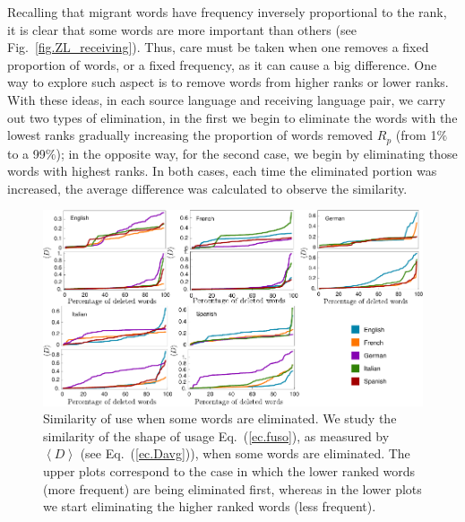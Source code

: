 \documentclass[10pt,letterpaper]{article} %
\newcommand{\eref}[1]{Eq.~(\ref{#1})}
\newcommand{\fref}[1]{Fig.~\ref{#1}}
\begin{document}



Recalling that migrant words have frequency inversely proportional to the rank,
it is clear that some words are more important than others (see
\fref{fig.ZL_receiving}).  Thus, care must be taken when one removes a fixed
proportion of words, or a fixed frequency, as it can cause a big difference. 
One way to explore such aspect is to remove words from higher ranks
or lower ranks. 
With these ideas, in each source language
and receiving language pair, we carry out two types of elimination, in the
first we begin to eliminate the words with the lowest ranks gradually 
increasing the proportion of words removed $R_{p}$ (from 1$\%$ to a
99$\%$); in the opposite way, for the second case,  we begin by
eliminating those words with highest ranks. In both cases,
each time the eliminated portion was increased, the average difference was
calculated to observe the similarity.


\begin{figure}[!h]
	\begin{adjustwidth}{-2.5cm}{1cm}
		\centering
		\includegraphics{images/dsFinal}
		\caption{{Similarity of use when some words are eliminated.}
We study the similarity of the shape of usage \eref{ec.fuso}, as measured by
$\left\langle D \right\rangle $ (see \eref{ec.Davg}), when some words are eliminated.
The upper plots correspond to the case in which the lower ranked words (more frequent) are being
eliminated first, whereas in the lower plots we start eliminating the higher ranked
words (less frequent). 
}
		\label{fig.RP}
	\end{adjustwidth}
\end{figure}
\end{document}
